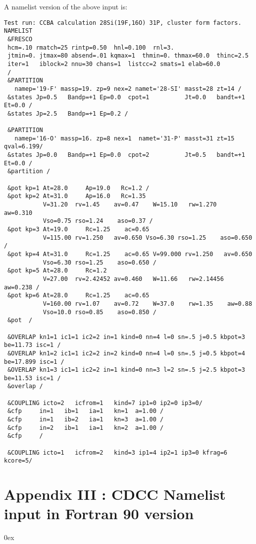 \documentclass[11pt]{article}
\begin{document}
\newpage
A namelist version of the above input is:
\begin{verbatim}
Test run: CCBA calculation 28Si(19F,16O) 31P, cluster form factors.
NAMELIST
 &FRESCO
 hcm=.10 rmatch=25 rintp=0.50  hnl=0.100  rnl=3.
 jtmin=0. jtmax=80 absend=.01 kqmax=1  thmin=0. thmax=60.0  thinc=2.5
 iter=1   iblock=2 nnu=30 chans=1  listcc=2 smats=1 elab=60.0
 /
 &PARTITION
   namep='19-F' massp=19. zp=9 nex=2 namet='28-SI' masst=28 zt=14 /
 &states Jp=0.5   Bandp=+1 Ep=0.0  cpot=1          Jt=0.0   bandt=+1 Et=0.0 /
 &states Jp=2.5   Bandp=+1 Ep=0.2 /

 &PARTITION
   namep='16-O' massp=16. zp=8 nex=1  namet='31-P' masst=31 zt=15 qval=6.199/
 &states Jp=0.0   Bandp=+1 Ep=0.0  cpot=2          Jt=0.5   bandt=+1 Et=0.0 /
 &partition /

 &pot kp=1 At=28.0     Ap=19.0   Rc=1.2 /
 &pot kp=2 At=31.0     Ap=16.0   Rc=1.35
           V=31.20  rv=1.45    av=0.47    W=15.10   rw=1.270   aw=0.310
           Vso=0.75 rso=1.24    aso=0.37 /
 &pot kp=3 At=19.0     Rc=1.25    ac=0.65
           V=115.00 rv=1.250   av=0.650 Vso=6.30 rso=1.25    aso=0.650 /
 &pot kp=4 At=31.0     Rc=1.25    ac=0.65 V=99.000 rv=1.250   av=0.650
           Vso=6.30 rso=1.25    aso=0.650 /
 &pot kp=5 At=28.0     Rc=1.2
           V=27.00  rv=2.42452 av=0.460   W=11.66   rw=2.14456 aw=0.238 /
 &pot kp=6 At=28.0     Rc=1.25    ac=0.65
           V=160.00 rv=1.07    av=0.72    W=37.0    rw=1.35    aw=0.88
           Vso=10.0 rso=0.85    aso=0.850 /
 &pot  /

 &OVERLAP kn1=1 ic1=1 ic2=2 in=1 kind=0 nn=4 l=0 sn=.5 j=0.5 kbpot=3 be=11.73 isc=1 /
 &OVERLAP kn1=2 ic1=1 ic2=2 in=2 kind=0 nn=4 l=0 sn=.5 j=0.5 kbpot=4 be=17.899 isc=1 /
 &OVERLAP kn1=3 ic1=1 ic2=2 in=1 kind=0 nn=3 l=2 sn=.5 j=2.5 kbpot=3 be=11.53 isc=1 /
 &overlap /

 &COUPLING icto=2   icfrom=1   kind=7 ip1=0 ip2=0 ip3=0/
 &cfp     in=1   ib=1   ia=1   kn=1  a=1.00 /
 &cfp     in=1   ib=2   ia=1   kn=3  a=1.00 /
 &cfp     in=2   ib=1   ia=1   kn=2  a=1.00 /
 &cfp     /

 &COUPLING icto=1   icfrom=2   kind=3 ip1=4 ip2=1 ip3=0 kfrag=6 kcore=5/
\end{verbatim}

\newpage
\section*{Appendix III : CDCC Namelist input in Fortran 90 version}
\hangindent 0ex
\end{document}
